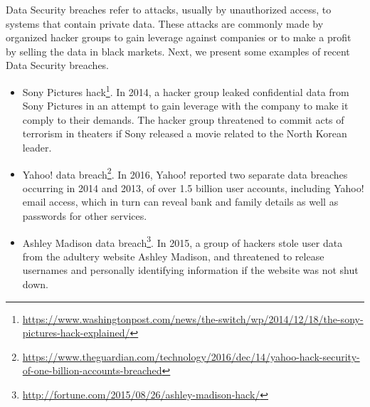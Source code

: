 Data Security breaches refer to attacks, usually by unauthorized access, to systems that contain private data. These attacks are commonly made by organized hacker groups to gain leverage against companies or to make a profit by selling the data in black markets. Next, we present some examples of recent Data Security breaches.
\begin{itemize}
    \setlength\itemsep{1em}

    \item Sony Pictures hack\footnote{\url{https://www.washingtonpost.com/news/the-switch/wp/2014/12/18/the-sony-pictures-hack-explained/}}. In 2014, a hacker group leaked confidential data from Sony Pictures in an attempt to gain leverage with the company to make it comply to their demands. The hacker group threatened to commit acts of terrorism in theaters if Sony released a movie related to the North Korean leader.

    \item Yahoo! data breach\footnote{\url{https://www.theguardian.com/technology/2016/dec/14/yahoo-hack-security-of-one-billion-accounts-breached}}. In 2016, Yahoo! reported two separate data breaches occurring in 2014 and 2013, of over 1.5 billion user accounts, including Yahoo! email access, which in turn can reveal bank and family details as well as passwords for other services.

    \item Ashley Madison data breach\footnote{\url{http://fortune.com/2015/08/26/ashley-madison-hack/}}. In 2015, a group of hackers stole user data from the adultery website Ashley Madison, and threatened to release usernames and personally identifying information if the website was not shut down.


\end{itemize}




